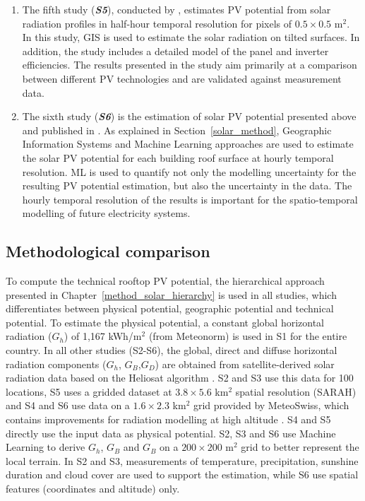 \begin{enumerate}
\item The fifth study (\textbf{\textit{S5}}), conducted by \citet{buffat_scalable_2018}, estimates PV potential from solar radiation profiles in half-hour temporal resolution for pixels of $0.5 \times 0.5$ m$^2$. In this study, GIS is used to estimate the solar radiation on tilted surfaces. In addition, the study includes a detailed model of the panel and inverter efficiencies. The results presented in the study aim primarily at a comparison between different PV technologies and are validated against measurement data.
\item The sixth study (\textbf{\textit{S6}}) is the estimation of solar PV potential presented above and published in \cite{walch_big_2020}. As explained in Section~\ref{solar_method}, Geographic Information Systems and Machine Learning approaches are used to estimate the solar PV potential for each building roof surface at hourly temporal resolution.
ML is used to quantify not only the modelling uncertainty for the resulting PV potential estimation, but also the uncertainty in the data. The hourly temporal resolution of the results is important for the spatio-temporal modelling of future electricity systems.   

\end{enumerate}
\subsection{Methodological comparison}

To compute the technical rooftop PV potential, the hierarchical approach presented in Chapter~\ref{method_solar_hierarchy} is used in all studies, which differentiates between physical potential, geographic potential and technical potential.
%
To estimate the physical potential, a constant global horizontal radiation ($G_h$) of 1,167 kWh/m$^2$ (from Meteonorm) is used in S1 for the entire country. In all other studies (S2-S6), the global, direct and diffuse horizontal radiation components ($G_h$, $G_B$,$G_D$) are obtained from satellite-derived solar radiation data based on the Heliosat algorithm \cite{rigollier_method_2004}. S2 and S3 use this data for 100 locations, S5 uses a gridded dataset at $3.8 \times 5.6$ km$^2$ spatial resolution (SARAH) and S4 and S6 use data on a $1.6 \times 2.3$ km$^2$ grid provided by MeteoSwiss, which contains improvements for radiation modelling at high altitude \cite{stockli_heliomont_2017}. S4 and S5 directly use the input data as physical potential. S2, S3 and S6 use Machine Learning to derive $G_h$, $G_B$ and $G_B$ on a $200 \times 200$ m$^2$ grid to better represent the local terrain. In S2 and S3, measurements of temperature, precipitation, sunshine duration and cloud cover are used to support the estimation, while S6 use spatial features (coordinates and altitude) only. 

